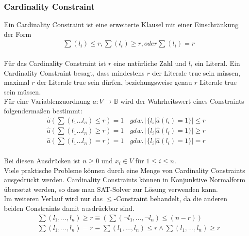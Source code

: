 \documentclass[a4,abstract=on]{scrartcl}
\begin{document}
\subsubsection{Cardinality Constraint}\label{baseCad}
Ein Cardinality Constraint \cite[vgl.][]{sinz} ist eine erweiterte Klausel mit einer Einschränkung der Form 
\begin{align*}
&\sum (l_i) \leq r, \sum (l_i) \geq r, oder \sum (l_i) = r
\end{align*}
\ \\
Für das Cardinality Constraint ist $r$ eine natürliche Zahl und $l_i$ ein Literal. Ein Cardinality Constraint besagt, dass mindestens $r$ der Literale true sein müssen, maximal $r$ der Literale true sein dürfen, beziehungsweise genau $r$ Literale true sein müssen.\\
Für eine Variablenzuordnung $a:V \rightarrow \mathbb{B}$ wird der Wahrheitswert eines Constraints folgendermaßen bestimmt:
\begin{align*}
\hat{a} (\sum(l_1 \dots l_n ) \leq r) = 1 {~~~~} gdw. {~} |\{l_i|\hat{a} (l_i) = 1\}| \leq r \\
\hat{a} (\sum(l_1 \dots l_n ) \geq r) = 1 {~~~~} gdw. {~} |\{l_i|\hat{a} (l_i) = 1\}| \geq r \\
\hat{a} (\sum(l_1 \dots l_n ) = r) = 1 {~~~~} gdw. {~} |\{l_i|\hat{a} (l_i) = 1\}| = r 
\end{align*}
\ \\
Bei diesen Ausdrücken ist $n\geq 0$ und $x_i \in V$ für $1 \leq i \leq n$.\\
Viele praktische Probleme können durch eine Menge von Cardinality Constraints ausgedrückt werden. Cardinality Constraints können in Konjunktive Normalform übersetzt werden, so dass man SAT-Solver zur Lösung verwenden kann.\\
Im weiteren Verlauf wird nur das $\leq$-Constraint behandelt, da die anderen beiden Constraints damit ausdrückbar sind.
\begin{align*}
&\sum (l_1, \dots, l_n) \geq r \equiv (\sum (\neg l_1, \dots, \neg l_n) \leq (n-r))\\
&\sum(l_1, \dots, l_n) = r \equiv \sum(l_1, \dots, l_n) \leq r \wedge \sum(l_1, \dots, l_n) \geq r
\end{align*}
\end{document}
